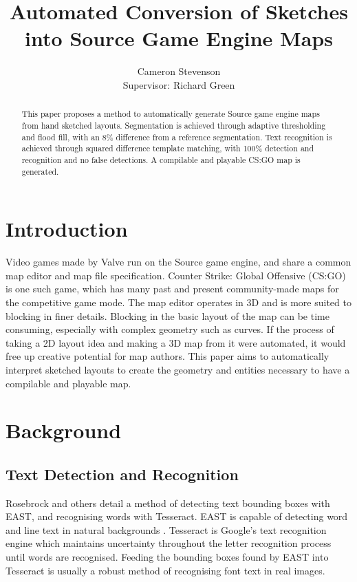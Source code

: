 \documentclass[11pt]{IEEEtran}
\begin{document}
\title{Automated Conversion of Sketches into Source Game Engine Maps}
\author{Cameron Stevenson\\[0.5cm]{\small Supervisor: Richard Green}}
 
 \maketitle
 
\begin{abstract}
This paper proposes a method to automatically generate Source game engine maps from hand sketched layouts. Segmentation is achieved through adaptive thresholding and flood fill, with an 8\% difference from a reference segmentation. Text recognition is achieved through squared difference template matching, with 100\% detection and recognition and no false detections. A compilable and playable CS:GO map is generated.
\end{abstract}

\section{Introduction}

Video games made by Valve run on the Source game engine, and share a common map editor and map file specification. Counter Strike: Global Offensive (CS:GO) is one such game, which has many past and present community-made maps for the competitive game mode. The map editor operates in 3D and is more suited to blocking in finer details. Blocking in the basic layout of the map can be time consuming, especially with complex geometry such as curves. If the process of taking a 2D layout idea and making a 3D map from it were automated, it would free up creative potential for map authors. This paper aims to automatically interpret sketched layouts to create the geometry and entities necessary to have a compilable and playable map.

\section{Background}
\subsection{Text Detection and Recognition}
Rosebrock \cite{rosebrock2018opencv} and others detail a method of detecting text bounding boxes with EAST, and recognising words with Tesseract. EAST is capable of detecting word and line text in natural backgrounds \cite{zhou2017east}. Tesseract \cite{smith2007overview} is Google's text recognition engine which maintains uncertainty throughout the letter recognition process until words are recognised. Feeding the bounding boxes found by EAST into Tesseract is usually a robust method of recognising font text in real images.
\end{document}
